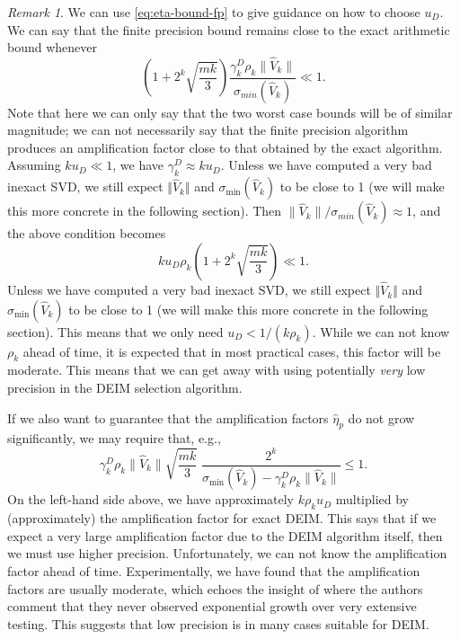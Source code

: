 \documentclass[12pt, a4paper]{article}
\newcommand{\Vhat}{\widehat{V}}
\def\norm#1{\|#1\|}
\theoremstyle{remark}
\newtheorem{remark}[theorem]{Remark}
\begin{document}
\begin{remark}
We can use \eqref{eq:eta-bound-fp} to give guidance on how to choose $u_{D}$. 
We can say that the finite precision bound remains close to the exact arithmetic bound whenever
\[
\left(1+ 2^k\sqrt{\frac{mk}{3}} \right) \frac{\gamma^D_k \rho_k \|\Vhat_k\|}{\sigma_{min}(\Vhat_k)} \ll 1.
\]
Note that here we can only say that the two worst case bounds will be of similar magnitude; we can not necessarily say that the finite precision algorithm produces an amplification factor close to that obtained by the exact algorithm. Assuming $ku_D \ll 1$, we have $\gamma^D_k \approx ku_D$. Unless we have computed a very bad inexact SVD, we still expect $\Vert \Vhat_k\Vert$ and $\sigma_{\min}(\Vhat_k)$ to be close to 1 (we will make this more concrete in the following section). Then $\|\Vhat_k\|/\sigma_{min}(\Vhat_k)\approx 1$, and the above condition becomes 
%
\begin{equation}
k u_{D} \rho_k \left( 1+ 2^k \sqrt{\frac{mk}{3}} \right) \ll 1.
\label{eq:uDEIM}
\end{equation}
Unless we have computed a very bad inexact SVD, we still expect $\Vert \Vhat_k\Vert$ and $\sigma_{\min}(\Vhat_k)$ to be close to 1 (we will make this more concrete in the following section). This means that we only need $u_{D} < 1/(k \rho_k)$. While we can not know $\rho_k$ ahead of time, it is expected that in most practical cases, this factor will be moderate. This means that we can get away with using potentially \emph{very} low precision in the DEIM selection algorithm.

If we also want to guarantee that the amplification factors $\widehat{\eta}_p$ do not grow significantly, we may require that, e.g., 
\[
\gamma^D_k \rho_k \|\Vhat_k\| \sqrt{\frac{mk}{3}}\;\frac{2^k}{\sigma_{\min}(\Vhat_k) - \gamma^D_k\rho_k\norm{\Vhat_k}} \leq 1.
\]
%
On the left-hand side above, we have approximately $k \rho_k u_{D}$ multiplied by (approximately) the amplification factor for exact DEIM. This says that if we expect a very large amplification factor due to the DEIM algorithm itself, then we must use higher precision. Unfortunately, we can not know the amplification factor ahead of time. Experimentally, we have found that the amplification factors are usually moderate, which echoes the insight of \cite{sorensen2016deim} where the authors comment that they never observed exponential growth over very extensive testing. This suggests that low precision is in many cases suitable for DEIM. 

\end{remark}
\end{document}
